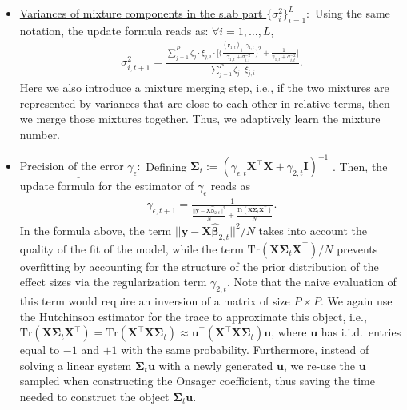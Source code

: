 \begin{itemize}
\item \underline{Variances of mixture components in the slab part $ \{ \sigma_{i}^2 \}_{i=1}^L:$} Using the same notation, the update formula reads as: $\forall i=1, \dots, L$,
\begin{align}
    \sigma_{i, t+1}^2 = \frac{\sum_{j=1}^P \zeta_j \cdot \xi_{j,i} \cdot \bigg [ \bigg ( \frac{(\bm{r}_{1,t})_j \cdot \gamma_{1,t}}{\gamma_{1,t} + \sigma_{i,t}^{-2}} \bigg )^2 + \frac{1}{\gamma_{1,t} + \sigma_{i,t}^{-2}} \bigg ] }{\sum_{j=1}^P \zeta_j \cdot \xi_{j,i}}.
\end{align}
Here we also introduce a mixture merging step, i.e., if the two mixtures are represented by variances that are close to each other in relative terms, then we merge those mixtures together. Thus, we adaptively learn the mixture number. 
\item $\underline{ \text{Precision of the error } \gamma_\epsilon }:$ Defining $\bm{\Sigma}_t := (\gamma_{\epsilon,t} \bm{X}^\top\bm{X} + \gamma_{2,t} \bm{I})^{-1}$ . Then, the update formula for the estimator of $\gamma_{\epsilon}$ reads as
\begin{align}
    \gamma_{\epsilon, t+1} = \frac{1}{\frac{||\bm{y} - \bm{X} \hat{\bm{\beta}}_{2,t}||^2}{N} + \frac{\text{Tr}(\bm{X} \bm{\Sigma}_t \bm{X}^\top)}{N}}.
\end{align}
In the formula above, the term $||\bm{y} - \bm{X} \hat{\bm{\beta}}_{2,t}||^2 / N$ takes into account the quality of the fit of the model, while the term $\text{Tr}(\bm{X} \bm{\Sigma}_t \bm{X}^\top) / N$ prevents overfitting by accounting for the structure of the prior distribution of the effect sizes via the regularization term $\gamma_{2,t}$. Note that the naive evaluation of this term would require an inversion of a matrix of size $P \times P$. We again use the Hutchinson estimator for the trace to approximate this object, i.e., $\text{Tr}(\bm{X} \bm{\Sigma}_t \bm{X}^\top) = \text{Tr}(\bm{X}^\top \bm{X} \bm{\Sigma}_t) \approx \bm{u}^\top (\bm{X}^\top \bm{X} \bm{\Sigma}_t) \bm{u}$, where $\bm{u}$ has i.i.d.\ entries equal to $-1$ and $+1$ with the same probability. Furthermore, instead of solving a linear system $\bm{\Sigma}_t \bm{u}$ with a newly generated $\bm{u}$, we re-use the $\bm{u}$ sampled when constructing the Onsager coefficient, thus saving the time needed to construct the object $\bm{\Sigma}_t \bm{u}$. 
\end{itemize}

